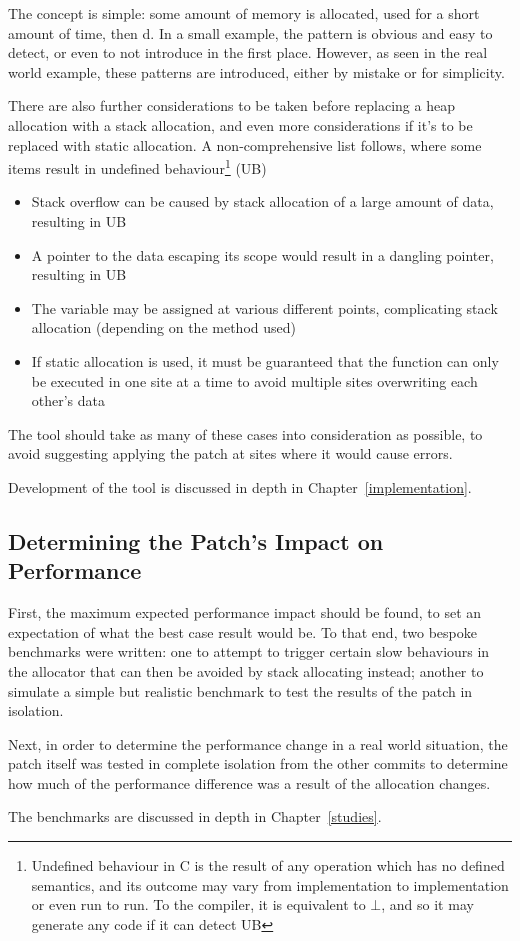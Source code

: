 The concept is simple: some amount of memory is allocated, used for a short amount of time, then \free{}d. In a small example, the pattern is obvious and easy to detect, or even to not introduce in the first place. However, as seen in the real world  example, these patterns are introduced, either by mistake or for simplicity.

There are also further considerations to be taken before replacing a heap allocation with a stack allocation, and even more considerations if it's to be replaced with static allocation. A non-comprehensive list follows, where some items result in undefined behaviour\footnote{Undefined behaviour in C is the result of any operation which has no defined semantics, and its outcome may vary from implementation to implementation or even run to run. To the compiler, it is equivalent to $\bot$, and so it may generate any code if it can detect UB} (UB)

\begin{itemize}
	\item Stack overflow can be caused by stack allocation of a large amount of data, resulting in UB
	\item A pointer to the data escaping its scope would result in a dangling pointer, resulting in UB
	\item The variable may be assigned at various different points, complicating stack allocation (depending on the method used)
	\item If static allocation is used, it must be guaranteed that the function can only be executed in one site at a time to avoid multiple sites overwriting each other's data
\end{itemize}

The tool should take as many of these cases into consideration as possible, to avoid suggesting applying the patch at sites where it would cause errors.

Development of the tool is discussed in depth in Chapter~\ref{implementation}.

\subsection{Determining the Patch's Impact on Performance}

First, the maximum expected performance impact should be found, to set an expectation of what the best case result would be. To that end, two bespoke benchmarks were written: one to attempt to trigger certain slow behaviours in the allocator that can then be avoided by stack allocating instead; another to simulate a simple but realistic benchmark to test the results of the patch in isolation.

Next, in order to determine the performance change in a real world situation, the  patch itself was tested in complete isolation from the other commits to determine how much of the performance difference was a result of the allocation changes.

The benchmarks are discussed in depth in Chapter~\ref{studies}.
